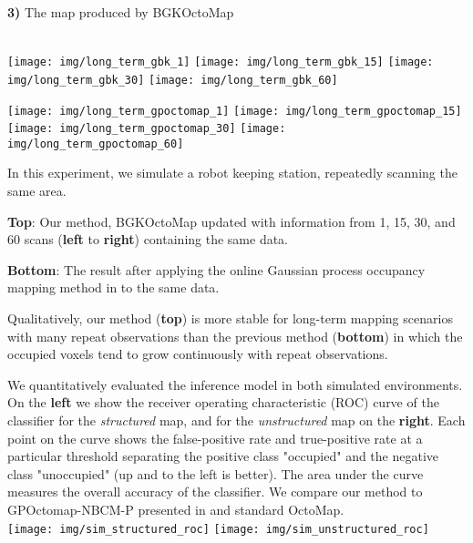 \documentclass[portrait,final,archD,fontscale=0.477]{baposter}
\begin{document}
\begin{poster}
{\textbf{3)} The map produced by BGKOctoMap

\vspace{0.1em}
\begin{multicols}{2}

\hfill \\

{ 
	\texttt{[image: img/long\_term\_gbk\_1]}
	\texttt{[image: img/long\_term\_gbk\_15]}
	\texttt{[image: img/long\_term\_gbk\_30]}
	\texttt{[image: img/long\_term\_gbk\_60]}
	}
	
	{
	
	\texttt{[image: img/long\_term\_gpoctomap\_1]}
	\texttt{[image: img/long\_term\_gpoctomap\_15]}
	\texttt{[image: img/long\_term\_gpoctomap\_30]}
	\texttt{[image: img/long\_term\_gpoctomap\_60]}
}

\columnbreak

In this experiment, we simulate a robot keeping station, repeatedly scanning the same area. 

\textbf{Top}: Our method, BGKOctoMap updated with information from 1, 15, 30, and 60 scans (\textbf{left} to \textbf{right}) containing the same data.

\textbf{Bottom}: The result after applying the online Gaussian process occupancy mapping method in \cite{jwang} to the same data.

Qualitatively, our method (\textbf{top}) is more stable for long-term mapping scenarios with many repeat observations than the previous method (\textbf{bottom}) in which the occupied voxels tend to grow continuously with repeat observations.

\end{multicols}

\setlength{\columnsep}{0.1em}
\vspace{0.1em}
\begin{multicols}{2}

We quantitatively evaluated the inference model in both simulated environments. On the \textbf{left} we show the receiver operating characteristic (ROC) curve of the classifier for the \textit{structured} map, and for the \textit{unstructured} map on the \textbf{right}. Each point on the curve shows the false-positive rate and true-positive rate at a particular threshold separating the positive class "occupied" and the negative class "unoccupied" (up and to the left is better). The area under the curve measures the overall accuracy of the classifier. We compare our method to GPOctomap-NBCM-P presented in \cite{jwang} and standard OctoMap.
\\


{
\texttt{[image: img/sim\_structured\_roc]}
\texttt{[image: img/sim\_unstructured\_roc]} 
}

\end{multicols}

}


\end{poster}
\end{document}
